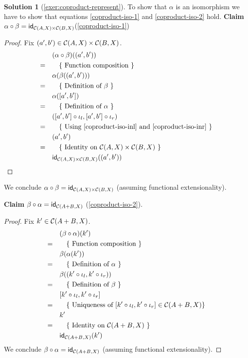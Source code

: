 \documentclass[a4paper,11pt, oneside,titlepage=false]{scrbook}
\theoremstyle{plain}
\theoremstyle{definition}
\newtheorem{solution}[thm]{Solution}
\newcommand{\cfont}[1]{\ensuremath{\mathsf{#1}}}
\newcommand{\Cat}[1]{\mathcal{#1}}
\newcommand{\CC}{\Cat{C}}
\newcommand{\Id}[1][]{\cfont{id}_{#1}}
\newcommand{\inl}{\ensuremath{\iota_l}}
\newcommand{\inr}{\ensuremath{\iota_r}}
\newcommand{\outofcoproduct}[2]{\ensuremath{[ #1, #2 ]}}
\newcommand{\co}[2]{\ensuremath{#2 \circ #1}}
\begin{document}
\begin{solution}[\cref{exer:coproduct-represent}]
To show that $\alpha$ is an isomorphism we have to show that equations \cref{coproduct-iso-1} and \cref{coproduct-iso-2} hold.
\textbf{Claim $\co {\beta} {\alpha} = \Id[\CQ]$}(\cref{coproduct-iso-1})
\begin{proof}
Fix $(a',b') \in \CQ$.
\begin{align*}
 &\quad (\co {\beta} {\alpha}) ((a',b'))\\
=&\qquad \text{\{ Function composition \}} \\
 &\quad \alpha(\beta((a',b'))) \\
=&\qquad \text{\{ Definition of $\beta$ \}} \\
 &\quad \alpha(\outofcoproduct{a'}{b'}) \\
=&\qquad \text{\{ Definition of $\alpha$ \}} \\
 &\quad (\co {\inl} {\outofcoproduct{a'}{b'}}, \co {\inr} {\outofcoproduct{a'}{b'}}) \\
=&\qquad \text{\{ Using \ref{coproduct-iso-inl} and \ref{coproduct-iso-inr} \}} \\
 &\quad (a', b') \\
=&\qquad \text{\{ Identity on $\CQ$ \}} \\
 &\quad \Id[\CQ]((a', b')) \\
\end{align*}
\end{proof}
We conclude $\co {\beta} {\alpha} = \Id[\CQ]$ (assuming functional extensionality).

\textbf{Claim $\co {\alpha} {\beta} = \Id[\CP]$} (\cref{coproduct-iso-2}).
\begin{proof}
Fix $k' \in \CP$.
\begin{align*}
 &\quad (\co {\alpha} {\beta}) (k')\\
=&\qquad \text{\{ Function composition \}} \\
 &\quad \beta(\alpha(k')) \\
=&\qquad \text{\{ Definition of $\alpha$ \}} \\
 &\quad \beta((\co {\inl} {k'}, \co {\inr} {k'}))\\
=&\qquad \text{\{ Definition of $\beta$ \}} \\
 &\quad \outofcoproduct{\co {\inl} {k'}}{\co {\inr} {k'}}\\
=&\qquad \text{\{ Uniqueness of $\outofcoproduct{\co {\inl} {k'}}{\co {\inr} {k'}} \in \CC(A+B,X) \}$} \\
 &\quad k'\\
=&\qquad \text{\{ Identity on $\CP$ \}} \\
 &\quad \Id[\CP] (k')
\end{align*}
We conclude $\co {\alpha} {\beta} = \Id[\CP]$ (assuming functional extensionality).
\end{proof}

\end{solution}
\end{document}
